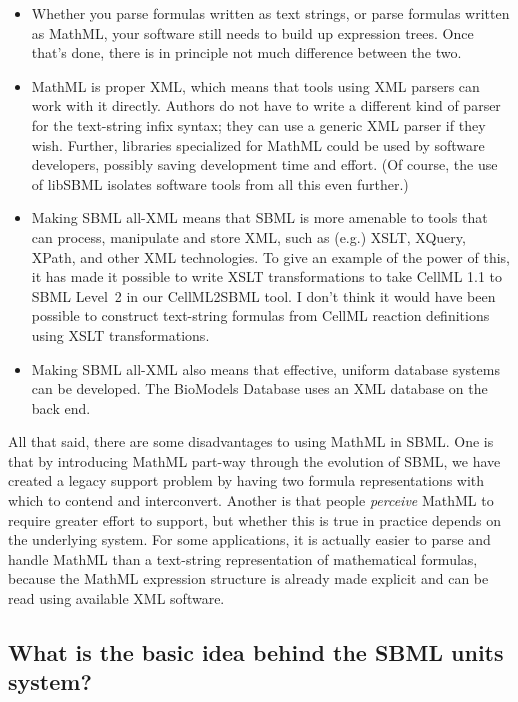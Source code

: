 \documentclass{sbmlfaq}
\begin{document}
\begin{itemize}
\item Whether you parse formulas written as text strings, or
  parse formulas written as MathML, your software still
  needs to build up expression trees.  Once that's done,
  there is in principle not much difference between the two.

\item MathML is proper XML, which means that tools using XML
  parsers can work with it directly.  Authors do not have to
  write a different kind of parser for the text-string infix
  syntax; they can use a generic XML parser if they wish.
  Further, libraries specialized for MathML could be used by
  software developers, possibly saving development time and
  effort.  (Of course, the use of libSBML isolates software
  tools from all this even further.)

\item Making SBML all-XML means that SBML is more amenable to
  tools that can process, manipulate and store XML, such as
  (e.g.) XSLT, XQuery, XPath, and other XML technologies.
  To give an example of the power of this, it has made it
  possible to write XSLT transformations to take CellML
  1.1 to SBML Level~2 in our CellML2SBML tool.  I don't
  think it would have been possible to construct text-string
  formulas from CellML reaction definitions using XSLT
  transformations.

\item Making SBML all-XML also means that effective, uniform
  database systems can be developed.  The BioModels Database
  uses an XML database on the back end.
  
  

\end{itemize}

All that said, there are some disadvantages to using MathML in SBML.  One
is that by introducing MathML part-way through the evolution of SBML, we
have created a legacy support problem by having two formula representations
with which to contend and interconvert.  Another is that people
\emph{perceive} MathML to require greater effort to support, but whether
this is true in practice depends on the underlying system.  For some
applications, it is actually easier to parse and handle MathML than a
text-string representation of mathematical formulas, because the MathML
expression structure is already made explicit and can be read using
available XML software.


\subsection{What is the basic idea behind the SBML units system?}
\end{document}
